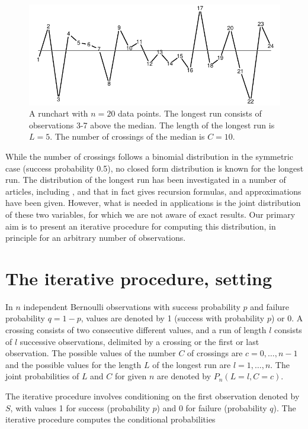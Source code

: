 \begin{figure}[htbp]
  \centering
  \caption{A runchart with $n=20$ data points. The longest run consists of observations 3-7 above the median. The length of the longest run is $L=5$. The number of crossings of the median is $C=10$.}
  \label{figure:fig1}
  \includegraphics{fig1}
\end{figure}

While the number of crossings follows a binomial distribution in the symmetric case (success probability 0.5), no closed form distribution is known for the longest run. The distribution of the longest run has been investigated in a number of articles, including \citep{Schilling:2012}, and \citep{Fazekas:2010} that in fact gives recursion formulas, and approximations have been given. However, what is needed in applications is the joint distribution of these two variables, for which we are not aware of exact results. Our primary aim is to present an iterative procedure for computing this distribution, in principle for an arbitrary number of observations.

\section{The iterative procedure, setting}

In $n$ independent Bernoulli observations with success probability $p$ and failure probability $q = 1 - p$, values are denoted by 1 (success with probability $p$) or 0. A crossing consists of two consecutive different values, and a run of length $l$ consists of $l$ successive observations, delimited by a crossing or the first or last observation. The possible values of the number $C$ of crossings are $c=0, \ldots ,n-1$ and the possible values for the length $L$ of the longest run are $l=1, \ldots ,n$. The joint probabilities of $L$ and $C$ for given $n$ are denoted by $P_n (L=l,C=c)$.

The iterative procedure involves conditioning on the first observation denoted by $S$, with values 1 for success (probability $p$) and 0 for failure (probability $q$). The iterative procedure computes the conditional probabilities 

